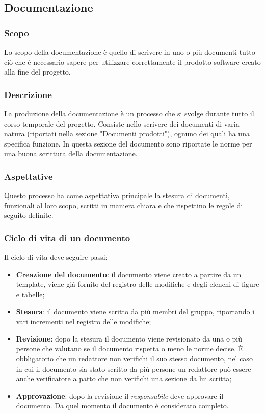 \documentclass[../norme_di_progetto.tex]{subfiles}
\begin{document}
\subsection{Documentazione}

\subsubsection{Scopo}
Lo scopo della documentazione è quello di scrivere in uno o più documenti tutto ciò che è necessario sapere per utilizzare correttamente il prodotto software creato alla fine del progetto.

\subsubsection{Descrizione}
La produzione della documentazione è un processo che si svolge durante tutto il corso temporale del progetto. Consiste nello scrivere dei documenti di varia natura (riportati nella sezione "Documenti prodotti"), ognuno dei quali ha una specifica funzione. In questa sezione del documento sono riportate le norme per una buona scrittura della documentazione.

\subsubsection{Aspettative}
Questo processo ha come aspettativa principale la stesura di documenti, funzionali al loro scopo, scritti in maniera chiara e che rispettino le regole di seguito definite.

\subsubsection{Ciclo di vita di un documento}
Il ciclo di vita deve seguire passi:
\begin{itemize}
    \item \textbf{Creazione del documento}: il documento viene creato a partire da un template, viene già fornito del registro delle modifiche e degli elenchi di figure e tabelle;
    \item \textbf{Stesura}: il documento viene scritto da più membri del gruppo, riportando i vari incrementi nel registro delle modifiche;
    \item \textbf{Revisione}: dopo la stesura il documento viene revisionato da una o più persone che valutano se il documento rispetta o meno le norme decise. È obbligatorio che un redattore non verifichi il suo stesso documento, nel caso in cui il documento sia stato scritto da più persone un redattore può essere anche verificatore a patto che non verifichi una sezione da lui scritta;
    \item \textbf{Approvazione}: dopo la revisione il \emph{responsabile} deve approvare il documento. Da quel momento il documento è considerato completo.
\end{itemize}
\end{document}
